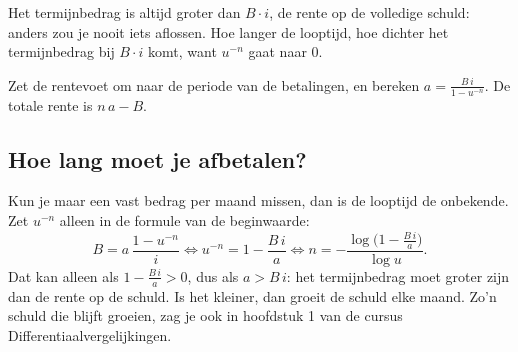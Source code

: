 Het termijnbedrag is altijd groter dan $B \cdot i$, de rente op de volledige schuld: anders zou je nooit iets aflossen. Hoe langer de looptijd, hoe dichter het termijnbedrag bij $B \cdot i$ komt, want $u^{-n}$ gaat naar 0.


\begin{werkwijze}
Zet de rentevoet om naar de periode van de betalingen, en bereken $a = \frac{B\,i}{1 - u^{-n}}$. De totale rente is $n\,a - B$.
\end{werkwijze}


\begin{oefeningen}
\end{oefeningen}

\subsection{Hoe lang moet je afbetalen?}

Kun je maar een vast bedrag per maand missen, dan is de looptijd de onbekende. Zet $u^{-n}$ alleen in de formule van de beginwaarde:
\[
B = a\,\frac{1 - u^{-n}}{i} \iff u^{-n} = 1 - \frac{B\,i}{a} \iff n = -\frac{\log \bigl(1 - \frac{B\,i}{a}\bigr)}{\log u} .
\]
Dat kan alleen als $1 - \frac{B\,i}{a} > 0$, dus als $a > B\,i$: het termijnbedrag moet groter zijn dan de rente op de schuld. Is het kleiner, dan groeit de schuld elke maand. Zo'n schuld die blijft groeien, zag je ook in hoofdstuk 1 van de cursus Differentiaalvergelijkingen.

